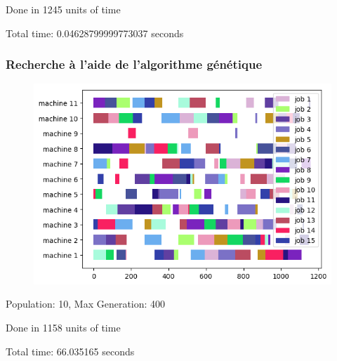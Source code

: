 Done in 1245 units of time

Total time: 0.04628799999773037 seconds 
\frameboxend

\newpage

\subsubsection{Recherche à l'aide de l'algorithme génétique}

\begin{figure}[!h]
    \centering
    \includegraphics[]{results/barnes_setb4c9_genetic.png}
\end{figure}

Population: 10, Max Generation: 400

Done in 1158 units of time

Total time: 66.035165 seconds
\frameboxend